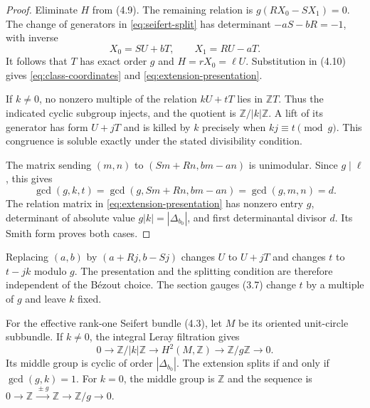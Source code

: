 \documentclass[11pt]{article}
\numberwithin{equation}{section}
\begin{document}
\begin{proof}
Eliminate $H$ from (4.9).  The remaining relation is
$g(RX_0-SX_1)=0$.  The change of generators in
\eqref{eq:seifert-split} has determinant $-aS-bR=-1$, with inverse
\[
             X_0=SU+bT,\qquad X_1=RU-aT.
\]
It follows that $T$ has exact order $g$ and $H=rX_0=\ell U$.
Substitution in (4.10) gives \eqref{eq:class-coordinates} and
\eqref{eq:extension-presentation}.

If $k\ne0$, no nonzero multiple of the relation $kU+tT$ lies in
$\mathbb ZT$.  Thus the indicated cyclic subgroup injects, and the
quotient is $\mathbb Z/|k|\mathbb Z$.  A lift of its generator has
form $U+jT$ and is killed by $k$ precisely when
$kj\equiv t\pmod g$.  This congruence is soluble exactly under the
stated divisibility condition.

The matrix sending $(m,n)$ to $(Sm+Rn,bm-an)$ is unimodular.
Since $g\mid\ell$, this gives
\[
 \gcd(g,k,t)=\gcd(g,Sm+Rn,bm-an)=\gcd(g,m,n)=d.
\]
The relation matrix in \eqref{eq:extension-presentation} has nonzero
entry $g$, determinant of absolute value $g|k|=|\Delta_{b_0}|$,
and first determinantal divisor $d$.  Its Smith form proves both cases.
\end{proof}

Replacing $(a,b)$ by $(a+Rj,b-Sj)$ changes $U$ to $U+jT$ and changes
$t$ to $t-jk$ modulo $g$.  The presentation and the splitting condition
are therefore independent of the B\'ezout choice.
The section gauges (3.7) change $t$ by a multiple of $g$ and leave $k$ fixed.

\begin{proposition}\label{prop:leray-extension}
For the effective rank-one Seifert bundle (4.3), let $M$ be its oriented
unit-circle subbundle.  If $k\ne0$, the integral Leray filtration gives
\begin{equation}\label{eq:leray-extension}
 0\longrightarrow\mathbb Z/|k|\mathbb Z
 \longrightarrow H^2(M,\mathbb Z)
 \longrightarrow\mathbb Z/g\mathbb Z\longrightarrow0.
\end{equation}
Its middle group is cyclic of order $|\Delta_{b_0}|$.
The extension splits if and only if $\gcd(g,k)=1$.
For $k=0$, the middle group is $\mathbb Z$ and the sequence is
$0\to\mathbb Z\xrightarrow{\,\pm g\,}\mathbb Z\to\mathbb Z/g\to0$.
\end{proposition}
\end{document}
